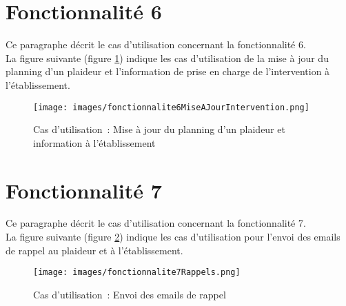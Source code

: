 \documentclass[asi, sansVersion]{picInsa}
\begin{document}
\section{Fonctionnalité 6}
Ce paragraphe décrit le cas d'utilisation concernant la fonctionnalité 6. \\

La figure suivante (figure \ref{diagrammeCasUtilisation6}) indique les cas d'utilisation de la mise à jour du planning d'un plaideur et l'information de prise en charge de l'intervention à l'établissement.
\begin{figure}[H]
	\centering
	\texttt{[image: images/fonctionnalite6MiseAJourIntervention.png]}
	\caption{Cas d'utilisation~: Mise à jour du planning d'un plaideur et information à l'établissement}
	\label{diagrammeCasUtilisation6}
\end{figure}




\section{Fonctionnalité 7}
Ce paragraphe décrit le cas d'utilisation concernant la fonctionnalité 7.\\

La figure suivante (figure \ref{diagrammeCasUtilisation7}) indique les cas d'utilisation pour l'envoi des emails de rappel au plaideur et à l'établissement.
\begin{figure}[H]
	\centering
	\texttt{[image: images/fonctionnalite7Rappels.png]}
	\caption{Cas d'utilisation~: Envoi des emails de rappel}
	\label{diagrammeCasUtilisation7}
\end{figure}
\end{document}
